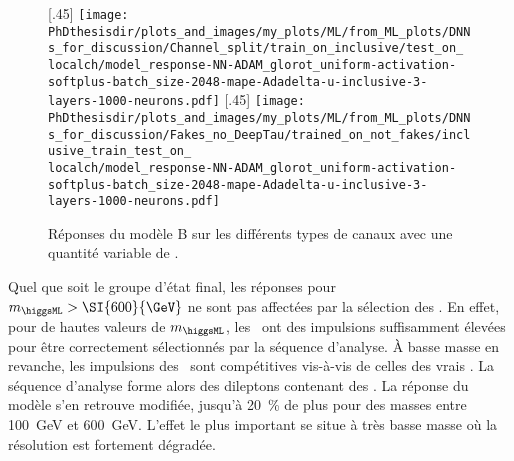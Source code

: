 \begin{figure}[p]
\def\localch{ll}
\subcaptionbox{Canaux \GetChannelStr{\localch}, \DEEPTAU.\label{subfig-B_few_fakes_\localch}}[.45\textwidth]
{\texttt{[image: \\PhDthesisdir/plots\_and\_images/my\_plots/ML/from\_ML\_plots/DNNs\_for\_discussion/Channel\_split/train\_on\_inclusive/test\_on\_\\localch/model\_response-NN-ADAM\_glorot\_uniform-activation-softplus-batch\_size-2048-mape-Adadelta-u-inclusive-3-layers-1000-neurons.pdf]}\vspace{-.5\baselineskip}}
\hfill
\subcaptionbox{Canaux \GetChannelStr{\localch}, BDT.\label{subfig-B_more_fakes_\localch}}[.45\textwidth]
{\texttt{[image: \\PhDthesisdir/plots\_and\_images/my\_plots/ML/from\_ML\_plots/DNNs\_for\_discussion/Fakes\_no\_DeepTau/trained\_on\_not\_fakes/inclusive\_train\_test\_on\_\\localch/model\_response-NN-ADAM\_glorot\_uniform-activation-softplus-batch\_size-2048-mape-Adadelta-u-inclusive-3-layers-1000-neurons.pdf]}\vspace{-.5\baselineskip}}

\caption[Effet des \ftauhs\ sur la réponse du modèle B.]{Réponses du modèle B sur les différents types de canaux avec une quantité variable de \ftauhs.}
\label{fig-fakes_B_tt-lt-ll}
\end{figure}
Quel que soit le groupe d'état final, les réponses pour $m_{\higgsML}>\SI{600}{\GeV}$ ne sont pas affectées par la sélection des \tauh.
En effet, pour de hautes valeurs de $m_{\higgsML}$, les \tauh\ ont des impulsions suffisamment élevées pour être correctement sélectionnés par la séquence d'analyse.
À basse masse en revanche,
les impulsions des \ftauhs\ sont compétitives vis-à-vis de celles des vrais \tauh.
La séquence d'analyse forme alors des dileptons contenant des \ftauhs.
La réponse du modèle s'en retrouve modifiée,
jusqu'à \SI{20}{\%} de plus
pour des masses entre \SI{100}{\GeV} et \SI{600}{\GeV}.
L'effet le plus important se situe à très basse masse où la résolution est fortement dégradée.
